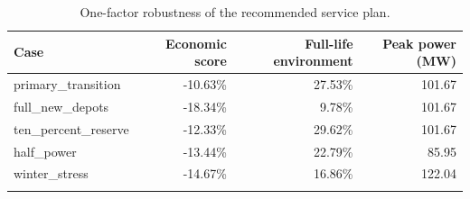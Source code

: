 \begin{table}[htbp]
\centering
\caption{One-factor robustness of the recommended service plan.}
\begin{tabularx}{\linewidth}{@{}Xrrr@{}}
\toprule
Case & Economic score & Full-life environment & Peak power (MW)\\
\midrule
primary\_transition & -10.63\% & 27.53\% & 101.67 \\\n
full\_new\_depots & -18.34\% & 9.78\% & 101.67 \\\n
ten\_percent\_reserve & -12.33\% & 29.62\% & 101.67 \\\n
half\_power & -13.44\% & 22.79\% & 85.95 \\\n
winter\_stress & -14.67\% & 16.86\% & 122.04 \\\n
\bottomrule
\end{tabularx}
\end{table}
